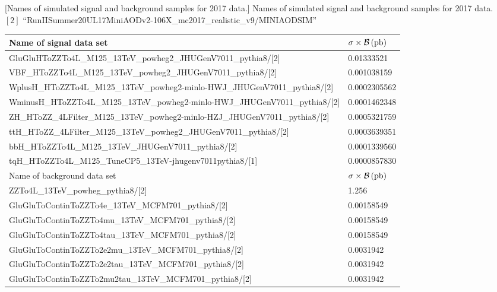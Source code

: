 \begin{table}[h]
    \small
        [Names of simulated signal and background samples for 2017 data.]
        {Names of simulated signal and background samples for 2017 data. \\
        $[2]$ ``RunIISummer20UL17MiniAODv2-106X\_mc2017\_realistic\_v9/MINIAODSIM''}
	\begin{tabular}{|ll|}
		\hline      
        Name of signal data set & $\sigma \times \mathcal{B}\,(\text{pb})$ \\
        \hline
		GluGluHToZZTo4L\_M125\_13TeV\_powheg2\_JHUGenV7011\_pythia8/[2]	&	0.01333521	\\
		VBF\_HToZZTo4L\_M125\_13TeV\_powheg2\_JHUGenV7011\_pythia8/[2]	&	0.001038159	\\
		WplusH\_HToZZTo4L\_M125\_13TeV\_powheg2-minlo-HWJ\_JHUGenV7011\_pythia8/[2]	&	0.0002305562	\\
		WminusH\_HToZZTo4L\_M125\_13TeV\_powheg2-minlo-HWJ\_JHUGenV7011\_pythia8/[2]	&	0.0001462348	\\
		ZH\_HToZZ\_4LFilter\_M125\_13TeV\_powheg2-minlo-HZJ\_JHUGenV7011\_pythia8/[2]	&	0.0005321759	\\
		ttH\_HToZZ\_4LFilter\_M125\_13TeV\_powheg2\_JHUGenV7011\_pythia8/[2]	&	0.0003639351	\\
		bbH\_HToZZTo4L\_M125\_13TeV\_JHUGenV7011\_pythia8/[2]	&	0.0001339560	\\
		tqH\_HToZZTo4L\_M125\_TuneCP5\_13TeV-jhugenv7011\-pythia8/[1]	&	0.0000857830	\\
		\hline	
		\hline	
        Name of background data set & $\sigma \times \mathcal{B}\,(\text{pb})$ \\
		\hline	
		ZZTo4L\_13TeV\_powheg\_pythia8/[2]	&	1.256	\\
		GluGluToContinToZZTo4e\_13TeV\_MCFM701\_pythia8/[2]	&	0.00158549	\\
		GluGluToContinToZZTo4mu\_13TeV\_MCFM701\_pythia8/[2]	&	0.00158549	\\
		GluGluToContinToZZTo4tau\_13TeV\_MCFM701\_pythia8/[2]	&	0.00158549	\\
		GluGluToContinToZZTo2e2mu\_13TeV\_MCFM701\_pythia8/[2]	&	0.0031942	\\
		GluGluToContinToZZTo2e2tau\_13TeV\_MCFM701\_pythia8/[2]	&	0.0031942	\\
		GluGluToContinToZZTo2mu2tau\_13TeV\_MCFM701\_pythia8/[2]	&	0.0031942	\\
        \hline
        \end{tabular}
    \label{table:2017_simSamples}
\end{table}
